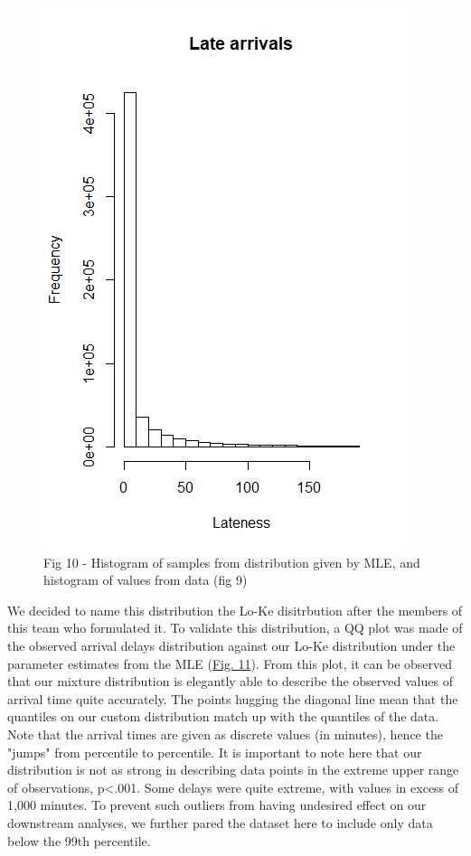 \documentclass[12pt, a4paper, openany]{book}
\newcommand\tab[1][1cm]{\hspace*{#1}}
\begin{document}
			\begin{figure}
			\centering
	 		\includegraphics[width = .45 \textwidth]{../figures/LateArrivalsHistogram}
	 		\caption{Fig 10 - Histogram of samples from distribution given by MLE, and histogram of values from data (fig 9)}
	 		\end{figure}
	\tab We decided to name this distribution the Lo-Ke disitrbution after the members of this team who formulated it. To validate this distribution, a QQ plot was made of the observed arrival delays distribution against our Lo-Ke distribution under the parameter estimates from the MLE (\underline{Fig. 11}). From this plot, it can be observed that our mixture distribution is elegantly able to describe the observed values of arrival time quite accurately. The points hugging the diagonal line mean that the quantiles on our custom distribution match up with the quantiles of the data. Note that the arrival times are given as discrete values (in minutes), hence the "jumps" from percentile to percentile. It is important to note here that our distribution is not as strong in describing data points in the extreme upper range of observations, p<.001. Some delays were quite extreme, with values in excess of 1,000 minutes. To prevent such outliers from having undesired effect on our downstream analyses, we further pared the dataset here to include only data below the 99th percentile.  \\
\end{document}
